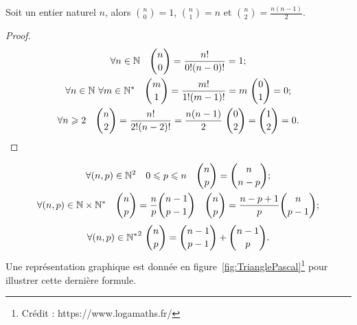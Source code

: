 \begin{prop}
  Soit un entier naturel \(n\), alors \(\binom{n}{0} = 1\), \(\binom{n}{1} = n\) 
  et \(\binom{n}{2} = \frac{n(n - 1)}{2}\).
\end{prop}

\begin{proof}
  \begin{gather}
    \forall n \in \mathbb{N} \quad \binom{n}{0} = \frac{n!}{0!(n - 0)!} = 1; \\
    \forall n \in \mathbb{N} \ \forall m\in \mathbb{N}^* \quad \binom{m}{1} = \frac{m!}{1!(m - 
    1)!} = m \ \binom{0}{1} = 0;\\
    \forall n \geqslant 2 \quad \binom{n}{2} = \frac{n!}{2!(n - 2)!} = \frac{n(n 
    - 1)}{2} \ \binom{0}{2} = \binom{1}{2} = 0.
  \end{gather}
\end{proof}

\begin{prop}
  \begin{gather}
    \forall (n, p)\in\mathbb{N}^2 \quad 0\leqslant p \leqslant n \quad \binom{n}{p} = 
    \binom{n}{n - p};\\
    \forall (n, p)\in\mathbb{N}\times\mathbb{N}^* \quad \binom{n}{p} = \frac{n}{p}\binom{n - 
    1}{p - 1} \quad \binom{n}{p} = \frac{n - p + 1}{p}\binom{n}{p - 1};
  \end{gather}
  \begin{equation}
    \label{eq:TrianglePascal}
    \forall (n, p)\in{\mathbb{N}^*}^2 \ \binom{n}{p} = \binom{n - 1}{p - 1} + \binom{n - 
    1}{p}.
  \end{equation}
  Une représentation graphique est donnée en 
  figure~\ref{fig:TrianglePascal}\footnote{Crédit : https://www.logamaths.fr/} 
  pour illustrer cette dernière formule.
\end{prop}

